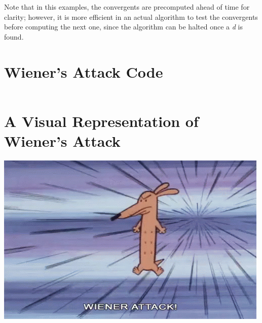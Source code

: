 \documentclass[11pt]{article}
\begin{document}
\begin{appendices}
Note that in this examples, the convergents are precomputed ahead of time for clarity; however, it is more efficient in an actual algorithm to test the convergents before computing the next one, since the algorithm can be halted once a \emph{d} is found.

\section{Wiener's Attack Code}
\inputminted{python}{test.py}

\section{A Visual Representation of Wiener's Attack}
\includegraphics{./tenor-0.png}

\end{appendices}

\medskip



\end{document}
